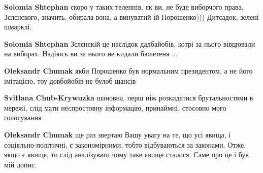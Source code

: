 \begin{itemize}
\begin{itemize}
 
\textbf{Solomia Shtephan} скоро у таких телепнів, як ви, не буде виборчого права. Зєлєнского, значить, обирала вона, а винуватий їй Порошенко))) Дитсадок, зелені шмарклі.

 
\textbf{Solomia Shtephan} Зєлєнскій це наслідок далбайобів, котрі за нього вівцювали на виборах. Надіюсь ви за нього не кидали бюлетеня ...

 
\textbf{Oleksandr Chumak} якби Порошенко був нормальним президентом, а не його імітацією, тоу довбойобів не булоб шансів

 
\textbf{Svitlana Chub-Krywuzka} шановна, перш ніж розкидатися брутальностями в мережі, слід мати неспростовну інформацію, принаймні, стосовно мого голосування

 
\textbf{Oleksandr Chumak} ще раз звертаю Вашу увагу на те, що усі явища, і соціяльно-політичні, є закономірними, тобто відбуваються за законами. Отже, якщо є явище, то слід аналізувати чому таке явище сталося. Саме про це і був мій допис.

 

\end{itemize}
\end{itemize}
